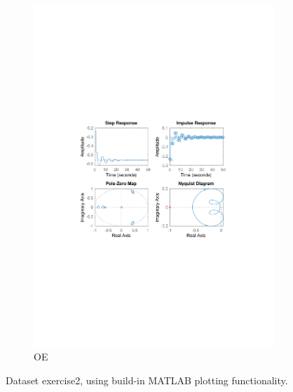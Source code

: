 \documentclass[]{article}
\begin{document}
\begin{figure}[ht]
\begin{subfigure}{.49\textwidth}
	\includegraphics[trim= 10cm 8cm 10cm 8cm, scale=0.4]{figures/3-OE-Ex2.pdf}
	\caption{OE}
	\label{fig:Ex2-OE}
\end{subfigure}
\caption{Dataset exercise2, using build-in MATLAB plotting functionality.}
\label{fig:Ex2}
\end{figure}
\end{document}
